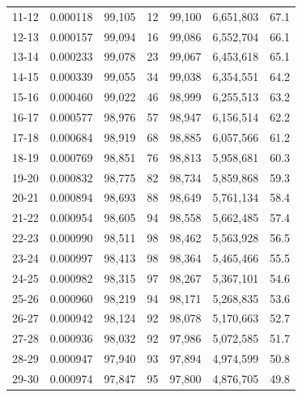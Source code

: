 \documentclass[10pt,a4paper]{article}
\begin{document}
\begin{longtable}{|c|c|c|c|c|c|c|}
11-12  & 0.000118      & 99,105       & 12            & 99,100        & 6,651,803    & 67.1         \\
12-13  & 0.000157      & 99,094       & 16            & 99,086        & 6,552,704    & 66.1         \\
13-14  & 0.000233      & 99,078       & 23            & 99,067        & 6,453,618    & 65.1         \\
14-15  & 0.000339      & 99,055       & 34            & 99,038        & 6,354,551    & 64.2         \\
15-16  & 0.000460      & 99,022       & 46            & 98,999        & 6,255,513    & 63.2         \\
16-17  & 0.000577      & 98,976       & 57            & 98,947        & 6,156,514    & 62.2         \\
17-18  & 0.000684      & 98,919       & 68            & 98,885        & 6,057,566    & 61.2         \\
18-19  & 0.000769      & 98,851       & 76            & 98,813        & 5,958,681    & 60.3         \\
19-20  & 0.000832      & 98,775       & 82            & 98,734        & 5,859,868    & 59.3         \\
20-21  & 0.000894      & 98,693       & 88            & 98,649        & 5,761,134    & 58.4         \\
21-22  & 0.000954      & 98,605       & 94            & 98,558        & 5,662,485    & 57.4         \\
22-23  & 0.000990      & 98,511       & 98            & 98,462        & 5,563,928    & 56.5         \\
23-24  & 0.000997      & 98,413       & 98            & 98,364        & 5,465,466    & 55.5         \\
24-25  & 0.000982      & 98,315       & 97            & 98,267        & 5,367,101    & 54.6         \\
25-26  & 0.000960      & 98,219       & 94            & 98,171        & 5,268,835    & 53.6         \\
26-27  & 0.000942      & 98,124       & 92            & 98,078        & 5,170,663    & 52.7         \\
27-28  & 0.000936      & 98,032       & 92            & 97,986        & 5,072,585    & 51.7         \\
28-29  & 0.000947      & 97,940       & 93            & 97,894        & 4,974,599    & 50.8         \\
29-30  & 0.000974      & 97,847       & 95            & 97,800        & 4,876,705    & 49.8         \\

\end{longtable}
\end{document}
